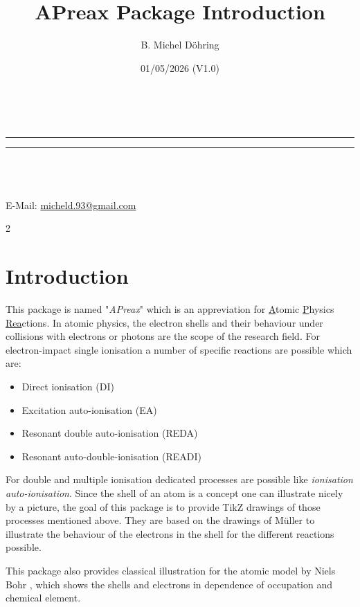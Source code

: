 \documentclass[
	a4paper,
	parskip=half,
    pagesize=auto,      		%
    listof=totoc,   		%
    bibliography=totoc,
	11pt
]{scrartcl}
\makeatletter
\newcommand{\linia}{\rule{\linewidth}{0.5pt} \rule{\linewidth}{0.5pt}}
\renewcommand{\maketitle}{
\begin{center}
\vspace{2ex}
{\huge \textsc{\@title}}
\vspace{1ex}
\\
\linia\\
\huge{\@date}\\
\vspace{5ex}
\@author\\ 
E-Mail: \href{mailto:micheld.93@ gmail.com}{micheld.93@gmail.com}\\
\vspace{10ex}
\end{center}
}
\makeatother
\begin{document}
\title{{\color[HTML]{FF0000} APreax Package Introduction}}

\author{B. Michel Döhring}

\date{01/05/2026 (V1.0)}

\maketitle

\begin{multicols}{2}
\tableofcontents
\end{multicols}

\onehalfspacing 




\section{Introduction}

This package is named "\textit{APreax}" which is an appreviation for \underline{A}tomic \underline{P}hysics \underline{Rea}ctions. 
In atomic physics, the electron shells and their behaviour under collisions with electrons or photons are the scope of the research field. 
For electron-impact single ionisation a number of specific reactions are possible which are: 

\begin{itemize}
    \item Direct ionisation (DI)
    \item Excitation auto-ionisation (EA)
    \item Resonant double auto-ionisation (REDA)
    \item Resonant auto-double-ionisation (READI)
\end{itemize}

For double and multiple ionisation dedicated processes are possible like \textit{ionisation auto-ionisation}. 
Since the shell of an atom is a concept one can illustrate nicely by a picture, the goal of this package is to provide TikZ \cite{tikz} drawings of those processes mentioned above. 
They are based on the drawings of Müller \cite{mueller2008} to illustrate the behaviour of the electrons in the shell for the different reactions possible. 

This package also provides classical illustration for the atomic model by Niels Bohr \cite{bohr1913}, which shows the shells and electrons in dependence of occupation and chemical element.  
\end{document}
